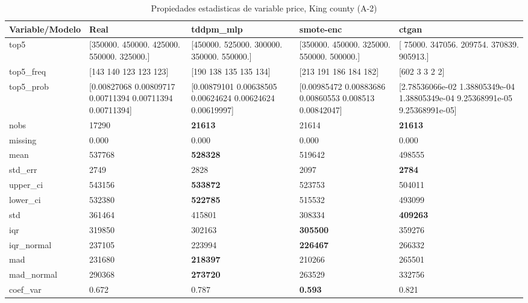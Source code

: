 \begin{table}[H]
\centering
\fontsize{8}{14}\selectfont
\caption{Propiedades  estadisticas de variable price, King county (A-2)}
\label{table-stats-king county-a-2-price}
\begin{tabular}{|l|m{10em}|m{10em}|m{10em}|m{10em}|}
\hline
 \rowcolor[gray]{0.8}
Variable/Modelo & Real & tddpm\_mlp & smote-enc & ctgan \\
\hline top5 & [350000. 450000. 425000. 550000. 325000.] & [450000. 525000. 300000. 350000. 550000.] & [350000. 450000. 325000. 550000. 500000.] & [ 75000. 347056. 209754. 370839. 905913.] \\
\hline top5\_freq & [143 140 123 123 123] & [190 138 135 135 134] & [213 191 186 184 182] & [602   3   3   2   2] \\
\hline top5\_prob & [0.00827068 0.00809717 0.00711394 0.00711394 0.00711394] & [0.00879101 0.00638505 0.00624624 0.00624624 0.00619997] & [0.00985472 0.00883686 0.00860553 0.008513   0.00842047] & [2.78536066e-02 1.38805349e-04 1.38805349e-04 9.25368991e-05
 9.25368991e-05] \\
\hline nobs & 17290 & \bfseries 21613 & \cellcolor[rgb]{0.9, 0.54, 0.52} 21614 & \bfseries 21613 \\
\hline missing & 0.000 & 0.000 & 0.000 & 0.000 \\
\hline mean & 537768 & \bfseries 528328 & 519642 & \cellcolor[rgb]{0.9, 0.54, 0.52} 498555 \\
\hline std\_err & 2749 & 2828 & \cellcolor[rgb]{0.9, 0.54, 0.52} 2097 & \bfseries 2784 \\
\hline upper\_ci & 543156 & \bfseries 533872 & 523753 & \cellcolor[rgb]{0.9, 0.54, 0.52} 504011 \\
\hline lower\_ci & 532380 & \bfseries 522785 & 515532 & \cellcolor[rgb]{0.9, 0.54, 0.52} 493099 \\
\hline std & 361464 & \cellcolor[rgb]{0.9, 0.54, 0.52} 415801 & 308334 & \bfseries 409263 \\
\hline iqr & 319850 & 302163 & \bfseries 305500 & \cellcolor[rgb]{0.9, 0.54, 0.52} 359276 \\
\hline iqr\_normal & 237105 & 223994 & \bfseries 226467 & \cellcolor[rgb]{0.9, 0.54, 0.52} 266332 \\
\hline mad & 231680 & \bfseries 218397 & 210266 & \cellcolor[rgb]{0.9, 0.54, 0.52} 265501 \\
\hline mad\_normal & 290368 & \bfseries 273720 & 263529 & \cellcolor[rgb]{0.9, 0.54, 0.52} 332756 \\
\hline coef\_var & 0.672 & 0.787 & \bfseries 0.593 & \cellcolor[rgb]{0.9, 0.54, 0.52} 0.821 \\

\end{tabular}
\end{table}
